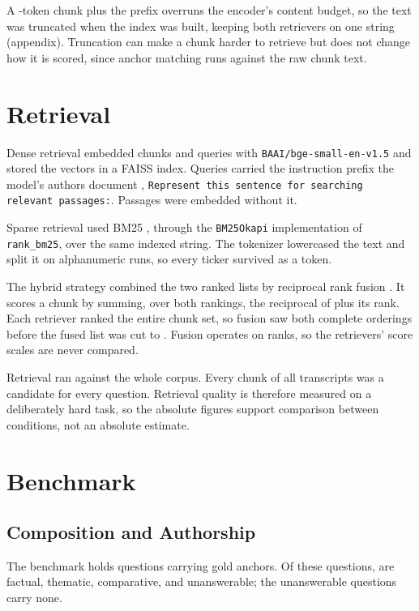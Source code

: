 A \thesisChunkSizeLarge{}-token chunk plus the prefix overruns the encoder's
content budget, so the text was truncated when the index was built, keeping
both retrievers on one string (appendix). Truncation can make a chunk harder to retrieve but
does not change how it is scored, since anchor matching runs against the raw
chunk text.

\section{Retrieval}

Dense retrieval embedded chunks and queries with
\texttt{BAAI/bge-small-en-v1.5} \parencite{baai2023} and stored the vectors in a
FAISS index. Queries carried the instruction prefix the model's authors document
\parencite{baai2023}, \texttt{Represent this sentence for searching relevant
passages:}. Passages were embedded without it.

Sparse retrieval used BM25 \parencite{robertson2009}, through the \texttt{BM25Okapi}
implementation of \texttt{rank\_bm25}, over the same indexed string. The
tokenizer lowercased the text and split it on alphanumeric runs, so every ticker
survived as a token.

The hybrid strategy combined the two ranked lists by reciprocal rank fusion
\parencite{cormack2009}. It scores a chunk by summing, over both rankings,
the reciprocal of \thesisRrfK{} plus its rank. Each retriever ranked the
entire chunk set, so fusion saw both complete orderings before the fused list
was cut to \thesisTopK{}. Fusion operates on ranks, so the retrievers' score
scales are never compared.

Retrieval ran against the whole corpus. Every chunk of all
\thesisNumTranscripts{} transcripts was a candidate for every question.
Retrieval quality is therefore measured on a
deliberately hard task, so the absolute figures support comparison between
conditions, not an absolute estimate.

\section{Benchmark}

\subsection{Composition and Authorship}

The benchmark holds \thesisNumQuestions{} questions carrying
\thesisNumGoldAnchors{} gold anchors. Of these questions,
\thesisNumQuestionsFactual{} are factual, \thesisNumQuestionsThematic{} thematic, \thesisNumQuestionsComparative{}
comparative, and \thesisNumQuestionsUnanswerable{} unanswerable; the unanswerable
questions carry none.

